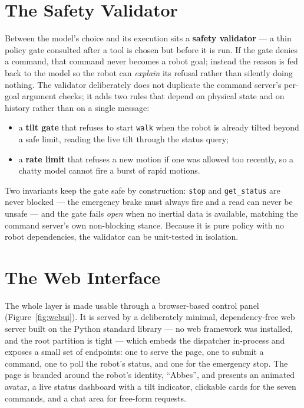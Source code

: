 \section{The Safety Validator}
\label{sec:ai-safety}
Between the model's choice and its execution sits a \textbf{safety
validator} --- a thin policy gate consulted after a tool is chosen but
before it is run. If the gate denies a command, that command never becomes
a robot goal; instead the reason is fed back to the model so the robot can
\emph{explain} its refusal rather than silently doing nothing. The
validator deliberately does not duplicate the command server's per-goal
argument checks; it adds two rules that depend on physical state and on
history rather than on a single message:
\begin{itemize}[itemsep=2pt,topsep=4pt]
  \item a \textbf{tilt gate} that refuses to start \texttt{walk} when the
        robot is already tilted beyond a safe limit, reading the live tilt
        through the status query;
  \item a \textbf{rate limit} that refuses a new motion if one was allowed
        too recently, so a chatty model cannot fire a burst of rapid
        motions.
\end{itemize}
Two invariants keep the gate safe by construction: \texttt{stop} and
\texttt{get\_status} are never blocked --- the emergency brake must always
fire and a read can never be unsafe --- and the gate fails \emph{open} when
no inertial data is available, matching the command server's own
non-blocking stance. Because it is pure policy with no robot dependencies,
the validator can be unit-tested in isolation.

\section{The Web Interface}
\label{sec:ai-webui}
The whole layer is made usable through a browser-based control panel
(Figure~\ref{fig:webui}). It is served by a deliberately minimal,
dependency-free web server built on the Python standard library --- no web
framework was installed, and the root partition is tight --- which embeds
the dispatcher in-process and exposes a small set of endpoints: one to
serve the page, one to submit a command, one to poll the robot's status,
and one for the emergency stop. The page is branded around the robot's
identity, ``Abbes'', and presents an animated avatar, a live status
dashboard with a tilt indicator, clickable cards for the seven commands,
and a chat area for free-form requests.

